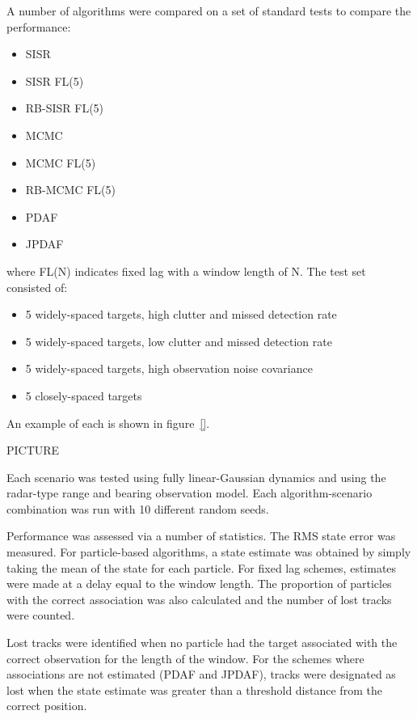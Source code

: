 A number of algorithms were compared on a set of standard tests to compare the performance:

\begin{itemize}
	\item SISR
	\item SISR FL(5)
	\item RB-SISR FL(5)
	\item MCMC
	\item MCMC FL(5)
	\item RB-MCMC FL(5)
	\item PDAF
	\item JPDAF
\end{itemize}

where FL(N) indicates fixed lag with a window length of N. The test set consisted of:

\begin{itemize}
	\item 5 widely-spaced targets, high clutter and missed detection rate
	\item 5 widely-spaced targets, low clutter and missed detection rate
	\item 5 widely-spaced targets, high observation noise covariance
	\item 5 closely-spaced targets
\end{itemize}

An example of each is shown in figure~\ref{}.

PICTURE

Each scenario was tested using fully linear-Gaussian dynamics and using the radar-type range and bearing observation model. Each algorithm-scenario combination was run with 10 different random seeds.

Performance was assessed via a number of statistics. The RMS state error was measured. For particle-based algorithms, a state estimate was obtained by simply taking the mean of the state for each particle. For fixed lag schemes, estimates were made at a delay equal to the window length. The proportion of particles with the correct association was also calculated and the number of lost tracks were counted.

Lost tracks were identified when no particle had the target associated with the correct observation for the length of the window. For the schemes where associations are not estimated (PDAF and JPDAF), tracks were designated as lost when the state estimate was greater than a threshold distance from the correct position.

